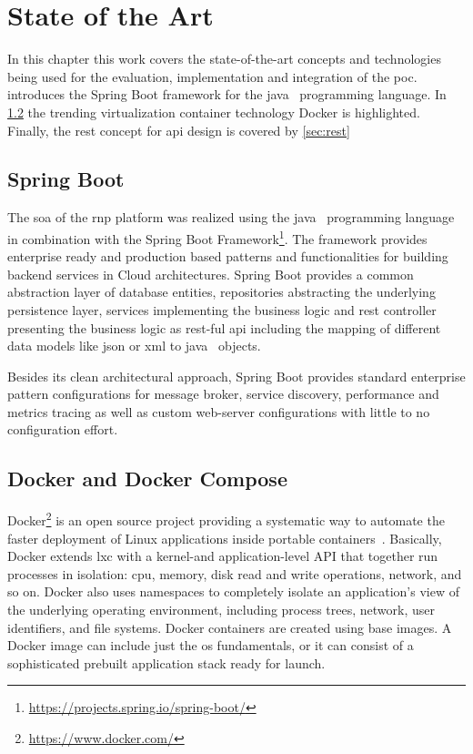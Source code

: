 \documentclass[
a4paper,
twoside,
headsepline,
cleardoublepage=empty,
parskip=half,
draft=false
]{scrbook}
\begin{document}
	\chapter{State of the Art}\label{ch:state_of_the_art}
	
		In this chapter this work covers the state-of-the-art concepts and technologies being used for the evaluation, implementation and integration of the \gls{poc}.  introduces the Spring Boot framework for the \gls{java}~\cite{java2015} programming language. In \cref{sec:docker} the trending virtualization container technology Docker is highlighted. Finally, the \gls{rest} concept for \gls{api} design is covered by \cref{sec:rest}

		\section{Spring Boot}\label{sec:spring_boot}

			The \gls{soa} of the \gls{rnp} platform was realized using the \gls{java}~\cite{java2015} programming language in combination with the Spring Boot Framework\footnote{\url{https://projects.spring.io/spring-boot/}}. The framework provides enterprise ready and production based patterns and functionalities for building backend services in Cloud architectures. Spring Boot provides a common abstraction layer of database entities, repositories abstracting the underlying persistence layer, services implementing the business logic and \gls{rest} controller presenting the business logic as \gls{rest}-ful \gls{api} including the mapping of different data models like \gls{json} or \gls{xml} to \gls{java}~\cite{java2015} objects.
			
			Besides its clean architectural approach, Spring Boot provides standard enterprise pattern configurations for message broker, service discovery, performance and metrics tracing as well as custom web-server configurations with little to no configuration effort.

		\section{Docker and Docker Compose}\label{sec:docker}
		
			Docker\footnote{\url{https://www.docker.com/}} is an open source project providing a systematic way to automate the faster deployment of Linux applications inside portable containers~\cite{bernstein2014containers}. 
			Basically, Docker extends \gls{lxc} with a kernel-and application-level API that together run processes in isolation: \gls{cpu}, memory, disk read and write operations, network, and so on. 
			Docker also uses namespaces to completely isolate an application’s view of the underlying operating environment, including process trees, network, user identifiers, and file systems.
			Docker containers are created using base images.
			A Docker image can include just the \gls{os} fundamentals, or it can consist of a sophisticated prebuilt application stack ready for launch. 
			
\end{document}

